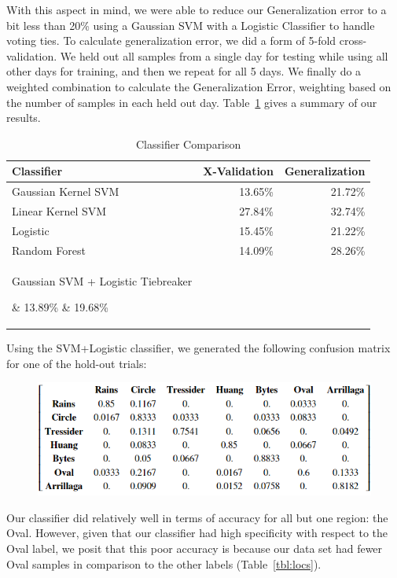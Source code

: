 \documentclass[journal]{IEEEtran}
\begin{document}
With this aspect in mind, we were able to reduce our Generalization error to a bit less than 20\% using a Gaussian SVM with a Logistic Classifier to handle voting ties. To calculate generalization error, we did a form of 5-fold cross-validation. We held out all samples from a single day for testing while using all other days for training, and then we repeat for all 5 days. We finally do a weighted combination to calculate the Generalization Error, weighting based on the number of samples in each held out day. Table~\ref{table:error} gives a summary of our results.
\setlength\extrarowheight{5pt}
\begin{table}[H]
\centering
\caption{Classifier Comparison}
\begin{tabularx}{\linewidth}{|X|r|r|}
\hline
\textbf{Classifier} & \textbf{X-Validation} & \textbf{Generalization}\\
\hline\hline
Gaussian Kernel SVM & 13.65\% & 21.72\%\\\hline
Linear Kernel SVM & 27.84\% & 32.74\%\\\hline
Logistic & 15.45\% & 21.22\%\\\hline
Random Forest & 14.09\% & 28.26\%\\ \hline
\noindent\parbox[c]{\hsize}{Gaussian SVM + Logistic Tiebreaker} & 13.89\% & 19.68\%\\\hline
\end{tabularx}
\label{table:error}
\end{table}
Using the SVM+Logistic classifier, we generated the following confusion matrix for one of the hold-out trials:
\begin{figure}[H]
\centering
\includegraphics[width=0.9\linewidth]{conf_mat_gen_test}
\end{figure}
Our classifier did relatively well in terms of accuracy for all but one region: the Oval. However, given that our classifier had high specificity with respect to the Oval label, we posit that this poor accuracy is because our data set had fewer Oval samples in comparison to the other labels (Table~\ref{tbl:locs}).
\end{document}

